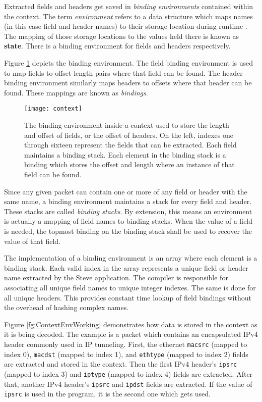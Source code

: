 Extracted fields and headers get saved in \textit{binding environments}
contained within the context. The term \textit{environment} refers to a data
structure which maps names (in this case field and header names) to their
storage location during runtime \cite{compilers1}. The mapping of those storage
locations to the values held there is known as \textbf{state}. There is a
binding environment for fields and headers respectively.

Figure \ref{fg:ContextEnv} depicts the binding environment. The field binding
environment is used to map fields to offset-length pairs where that field can be
found. The header binding environment similarly maps headers to offsets where
that header can be found. These mappings are known as \textit{bindings}.

\begin{figure}
\texttt{[image: context]}
\caption{The binding environment inside a context used to store the length and
offset of fields, or the offset of headers. On the left, indexes one through
sixteen represent the fields that can be extracted. Each field maintains a
binding stack. Each element in the binding stack is a binding which stores the
offset and length where an instance of that field can be found. }
\label{fg:ContextEnv}
\end{figure}

Since any given packet can contain one or more of any field or header with the
same name, a binding environment maintains a stack for every field and header.
These stacks are called \textit{binding stacks}. By extension, this means an
environment is actually a mapping of field names to binding stacks. When the
value of a field is needed, the topmost binding on the binding stack shall be
used to recover the value of that field.

The implementation of a binding environment is an array where each element is a binding stack. Each valid index
in the array represents a unique field or header name extracted by the Steve
application. The compiler is responsible for associating all unique field names
to unique integer indexes. The same is done for all unique headers. This
provides constant time lookup of field bindings without the overhead of hashing
complex names.

Figure \ref{fg:ContextEnvWorking} demonstrates how data is stored in the context
as it is being decoded. The example is a packet which contains an encapsulated
IPv4 header commonly used in IP tunneling. First, the ethernet \texttt{macsrc} (mapped to index 0), \texttt{macdst} (mapped to index 1), and \texttt{ethtype} (mapped to index 2) fields are extracted and stored in the context. Then the first IPv4 header's \texttt{ipsrc} (mapped to index 3) and \texttt{iptype} (mapped to index 4) fields are extracted. After that, another IPv4 header's \texttt{ipsrc} and \texttt{ipdst} fields are extracted. If the value of \texttt{ipsrc} is used in the program, it is the second one which gets used.

